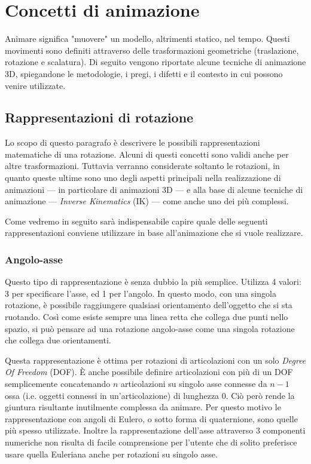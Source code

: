 

\chapter{Concetti di animazione} %

\label{Chapter3} %

Animare significa "muovere" un modello, altrimenti statico, nel tempo. Questi movimenti sono definiti attraverso delle trasformazioni geometriche (traslazione, rotazione e scalatura).
Di seguito vengono riportate alcune tecniche di animazione 3D, spiegandone le metodologie, i pregi, i difetti e il contesto in cui possono venire utilizzate. 


\section{Rappresentazioni di rotazione}\label{Section3.1}
Lo scopo di questo paragrafo è descrivere le possibili rappresentazioni matematiche di una rotazione.
Alcuni di questi concetti sono validi anche per altre trasformazioni.
Tuttavia verranno considerate soltanto le rotazioni, in quanto queste ultime sono uno degli aspetti principali nella realizzazione di animazioni --- in particolare di animazioni 3D --- e alla base di alcune tecniche di animazione --- \emph{Inverse Kinematics} (IK) --- come anche uno dei più complessi. 

Come vedremo in seguito sarà indispensabile capire quale delle seguenti rappresentazioni conviene utilizzare in base all'animazione che si vuole realizzare.


\subsection{Angolo-asse}
Questo tipo di rappresentazione è senza dubbio la più semplice.
Utilizza 4 valori: 3 per specificare l'asse, ed 1 per l'angolo.
In questo modo, con una singola rotazione, è possibile raggiungere qualsiasi orientamento dell'oggetto che si sta ruotando.
Così come esiste sempre una linea retta che collega due punti nello spazio, si può pensare ad una rotazione angolo-asse come una singola rotazione che collega due orientamenti.

Questa rappresentazione è ottima per rotazioni di articolazioni con un solo \emph{Degree Of Freedom} (DOF).
È anche possibile definire articolazioni con più di un DOF semplicemente concatenando $n$ articolazioni su singolo asse connesse da $n-1$ ossa (i.e. oggetti connessi in un'articolazione) di lunghezza 0.
Ciò però rende la giuntura risultante inutilmente complessa da animare.
Per questo motivo le rappresentazione con angoli di Eulero, o sotto forma di quaternione, sono quelle più spesso utilizzate.
Inoltre la rappresentazione dell'asse attraverso 3 componenti numeriche non risulta di facile comprensione per l'utente che di solito preferisce usare quella Euleriana anche per rotazioni su singolo asse.

